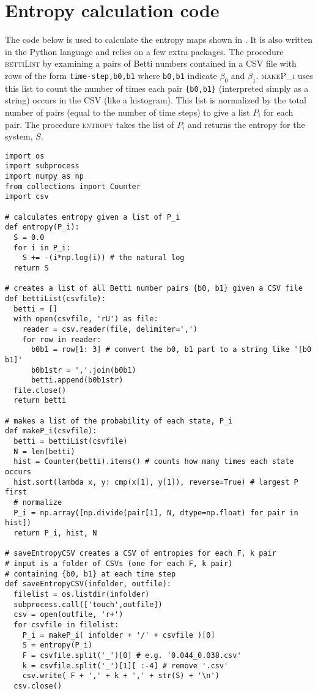 \section{Entropy calculation code}

The code below is used to calculate the entropy maps shown in . It is also written in the Python language and relies on a few extra packages. The procedure \textsc{bettiList} by examining a pairs of Betti numbers contained in a CSV file with rows of the form \texttt{time-step,b0,b1} where \texttt{b0,b1} indicate $\beta_0$ and $\beta_1$. \textsc{makeP\_i} uses this list to count the number of times each pair \verb+{b0,b1}+ (interpreted simply as a string) occurs in the CSV (like a histogram). This list is normalized by the total number of pairs (equal to the number of time steps) to give a list $P_i$ for each pair. The procedure \textsc{entropy} takes the list of $P_i$ and returns the entropy for the system, $S$.

\begin{Verbatim}[fontsize=\footnotesize,frame=leftline,framesep=5mm]
import os
import subprocess
import numpy as np
from collections import Counter
import csv

# calculates entropy given a list of P_i
def entropy(P_i):
  S = 0.0
  for i in P_i:
    S += -(i*np.log(i)) # the natural log
  return S

# creates a list of all Betti number pairs {b0, b1} given a CSV file
def bettiList(csvfile):
  betti = []
  with open(csvfile, 'rU') as file:
    reader = csv.reader(file, delimiter=',')
    for row in reader:
      b0b1 = row[1: 3] # convert the b0, b1 part to a string like '[b0 b1]'
      b0b1str = ','.join(b0b1)
      betti.append(b0b1str)
  file.close()
  return betti

# makes a list of the probability of each state, P_i
def makeP_i(csvfile):
  betti = bettiList(csvfile)
  N = len(betti)
  hist = Counter(betti).items() # counts how many times each state occurs
  hist.sort(lambda x, y: cmp(x[1], y[1]), reverse=True) # largest P first
  # normalize
  P_i = np.array([np.divide(pair[1], N, dtype=np.float) for pair in hist])
  return P_i, hist, N

# saveEntropyCSV creates a CSV of entropies for each F, k pair
# input is a folder of CSVs (one for each F, k pair)
# containing {b0, b1} at each time step
def saveEntropyCSV(infolder, outfile):
  filelist = os.listdir(infolder)
  subprocess.call(['touch',outfile])
  csv = open(outfile, 'r+')
  for csvfile in filelist:
    P_i = makeP_i( infolder + '/' + csvfile )[0]
    S = entropy(P_i)
    F = csvfile.split('_')[0] # e.g. '0.044_0.038.csv'
    k = csvfile.split('_')[1][ :-4] # remove '.csv'
    csv.write( F + ',' + k + ',' + str(S) + '\n') 
  csv.close()
\end{Verbatim}